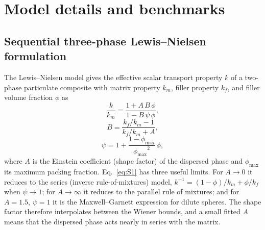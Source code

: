 \documentclass[10pt,a4paper]{article}
\newcommand{\phimax}{\ensuremath{\phi_{\max}}}
\begin{document}
\section{Model details and benchmarks}
\label{si:model}

\subsection{Sequential three-phase Lewis--Nielsen formulation}
\label{si:formulation}
The Lewis--Nielsen model gives the effective scalar transport property $k$ of a two-phase particulate composite with matrix property $k_m$, filler property $k_f$, and filler volume fraction $\phi$ as
\begin{equation}
\frac{k}{k_m} = \frac{1 + A\,B\,\phi}{1 - B\,\psi\,\phi},
\label{eq:S1}
\end{equation}
\begin{equation}
B = \frac{k_f/k_m - 1}{k_f/k_m + A},
\label{eq:S2}
\end{equation}
\begin{equation}
\psi = 1 + \frac{1 - \phimax}{\phimax^{2}}\,\phi ,
\label{eq:S3}
\end{equation}
where $A$ is the Einstein coefficient (shape factor) of the dispersed phase and \phimax{} its maximum packing fraction. Eq.~\ref{eq:S1} has three useful limits. For $A \to 0$ it reduces to the series (inverse rule-of-mixtures) model, $k^{-1} = (1-\phi)/k_m + \phi/k_f$ when $\psi \to 1$; for $A \to \infty$ it reduces to the parallel rule of mixtures; and for $A = 1.5$, $\psi = 1$ it is the Maxwell--Garnett expression for dilute spheres. The shape factor therefore interpolates between the Wiener bounds, and a small fitted $A$ means that the dispersed phase acts nearly in series with the matrix.
\end{document}
